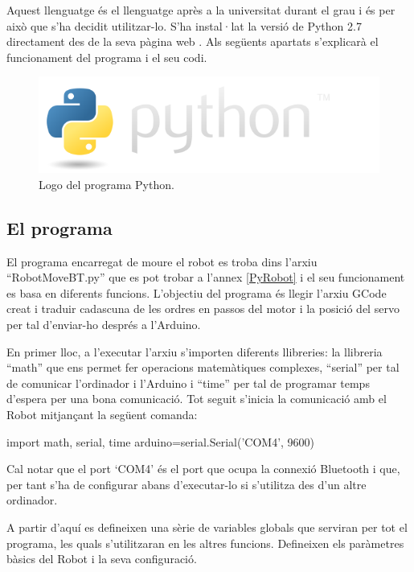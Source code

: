Aquest llenguatge és el llenguatge après a la universitat durant el grau i és per això que s’ha decidit utilitzar-lo. S’ha instal·lat la versió de Python 2.7 directament des de la seva pàgina web \cite{PythonWeb}. Als següents apartats s’explicarà el funcionament del programa i el seu codi. 

\begin{figure}[H]
	\centering
	\includegraphics[scale=0.5]{python-logo.png}
	\caption{Logo del programa Python.}
	\label{fig:pythonlogo}
\end{figure}

\subsection{El programa}\label{sec:robotmoveBT}

El programa encarregat de moure el robot es troba dins l’arxiu “RobotMoveBT.py” que es pot trobar a l’annex \ref{PyRobot} i el seu funcionament es basa en diferents funcions. L’objectiu del programa és llegir l’arxiu GCode creat i traduir cadascuna de les ordres en passos del motor i la posició del servo per tal d’enviar-ho després a l’Arduino. 

En primer lloc, a l'executar l’arxiu s’importen diferents llibreries: la llibreria “math” que ens permet fer operacions matemàtiques complexes, “serial” per tal de comunicar l’ordinador i l’Arduino i “time” per tal de programar temps d’espera per una bona comunicació. Tot seguit s’inicia la comunicació amb el Robot mitjançant la següent comanda:

\begin{python}
	import math, serial, time
	arduino=serial.Serial('COM4', 9600)
\end{python}

Cal notar que el port ‘COM4’ és el port que ocupa la connexió Bluetooth i que, per tant s’ha de configurar abans d’executar-lo si s’utilitza des d’un altre ordinador. 

A partir d’aquí es defineixen una sèrie de variables globals que serviran per tot el programa, les quals s’utilitzaran en les altres funcions. Defineixen els paràmetres bàsics del Robot i la seva configuració. 

